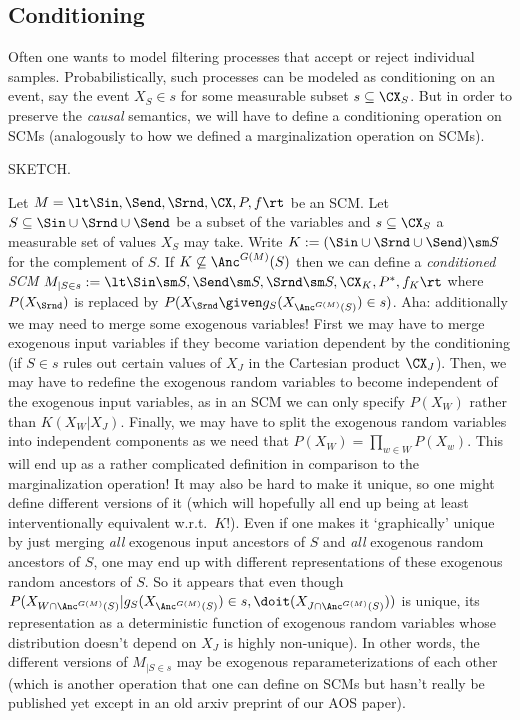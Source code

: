 \subsection{Conditioning}


Often one wants to model filtering processes that accept or reject individual samples.
Probabilistically, such processes can be modeled as conditioning on an event, say the
event $X_S \in s$ for some measurable subset $s \subseteq \CX_S$.
But in order to preserve the \emph{causal} semantics, we will have to define a conditioning
operation on SCMs (analogously to how we defined a marginalization operation on SCMs).

\begin{Def}\label{def:conditioned_scm}
  SKETCH.

  Let $M = \lt \Sin, \Send, \Srnd, \CX, P, f \rt$ be an SCM.
  Let $S \subseteq \Sin \cup \Srnd \cup \Send$ be a subset of the variables and $s \subseteq \CX_S$ a measurable set of values $X_S$ may take.
  Write $K := (\Sin \cup \Srnd \cup \Send) \sm S$ for the complement of $S$.
  If $K \not\subseteq \Anc^{G(M)}(S)$ then we can define a \emph{conditioned SCM}
  $M_{|S\in s} := \lt \Sin \sm S, \Send \sm S, \Srnd \sm S, \CX_K, P^*, f_K \rt$
  where $P(X_{\Srnd})$ is replaced by $P(X_{\Srnd} \given g_S(X_{\Anc^{G(M)}(S)}) \in s)$.
  Aha: additionally we may need to merge some exogenous variables!
  First we may have to merge exogenous input variables if they become variation dependent by the conditioning (if $S \in s$ rules out certain values of $X_J$ in the Cartesian product $\CX_J$).
  Then, we may have to redefine the exogenous random variables to become independent of the exogenous input variables, as in an SCM we can only specify $P(X_W)$ rather than $K(X_W | X_J)$.
  Finally, we may have to split the exogenous random variables into independent components as we need that $P(X_W) = \prod_{w \in W} P(X_w)$.
  This will end up as a rather complicated definition in comparison to the marginalization operation!
  It may also be hard to make it unique, so one might define different versions of it (which will hopefully all end up being at least interventionally equivalent w.r.t.\ $K$!).
  Even if one makes it `graphically' unique by just merging \emph{all} exogenous input ancestors of $S$ and \emph{all} exogenous random ancestors of $S$, one may end up with different representations of these exogenous random ancestors of $S$.
  So it appears that even though
  $P(X_{W \cap \Anc^{G(M)}(S)} | g_S(X_{\Anc^{G(M)}(S)}) \in s, \doit(X_{J \cap \Anc^{G(M)}(S)}))$ is unique, its representation as a deterministic function of exogenous random variables whose
  distribution doesn't depend on $X_J$ is highly non-unique).
  In other words, the different versions of $M_{|S\in s}$ may be exogenous reparameterizations of each other (which is another operation that one can define on SCMs but hasn't really be published yet except in an old arxiv preprint of our AOS paper).
\end{Def}

